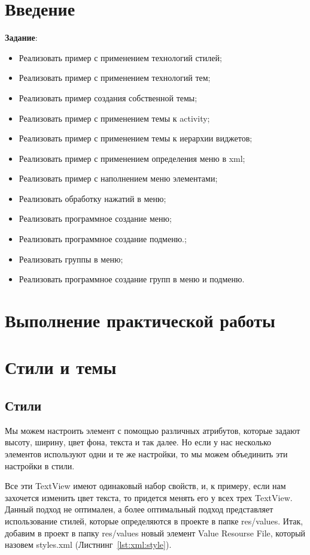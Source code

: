 \graphicspath{{./tenth/img}}

\section*{\LARGE{Введение}}

\textbf{Задание}:
\begin{itemize}
	\item Реализовать пример с применением технологий стилей;
	\item Реализовать пример с применением технологий тем;
	\item Реализовать пример создания собственной темы;
	\item Реализовать пример с применением темы к activity;
	\item Реализовать пример с применением темы к иерархии виджетов;
	\item Реализовать пример с применением определения меню в xml;
	\item Реализовать пример с наполнением меню элементами;
	\item Реализовать обработку нажатий в меню;
	\item Реализовать программное создание меню;
	\item Реализовать программное создание подменю.;
	\item Реализовать группы в меню;
	\item Реализовать программное создание групп в меню и подменю.
\end{itemize}

\clearpage

\section*{\LARGE{Выполнение практической работы}}

\section{Стили и темы}
\subsection{Стили}
Мы можем настроить элемент с помощью различных атрибутов, которые
задают высоту, ширину, цвет фона, текста и так далее. Но если у нас
несколько элементов используют одни и те же настройки, то мы можем
объединить эти настройки в стили.\par
Все эти TextView имеют одинаковый набор свойств, и, к примеру, если нам
захочется изменить цвет текста, то придется менять его у всех трех TextView.
Данный подход не оптимален, а более оптимальный подход представляет
использование стилей, которые определяются в проекте в папке res/values.
Итак, добавим в проект в папку res/values новый элемент Value Resourse
File, который назовем styles.xml (Листнинг~\ref{lst:xml:style}).

